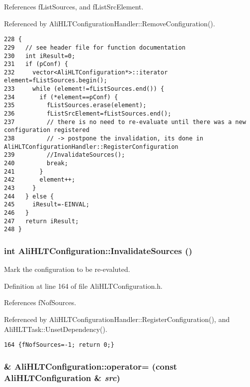 References f\-List\-Sources, and f\-List\-Src\-Element.

Referenced by Ali\-HLTConfiguration\-Handler::Remove\-Configuration().

\footnotesize\begin{verbatim}228 {
229   // see header file for function documentation
230   int iResult=0;
231   if (pConf) {
232     vector<AliHLTConfiguration*>::iterator element=fListSources.begin();
233     while (element!=fListSources.end()) {
234       if (*element==pConf) {
235         fListSources.erase(element);
236         fListSrcElement=fListSources.end();
237         // there is no need to re-evaluate until there was a new configuration registered
238         // -> postpone the invalidation, its done in AliHLTConfigurationHandler::RegisterConfiguration
239         //InvalidateSources();
240         break;
241       }
242       element++;
243     }
244   } else {
245     iResult=-EINVAL;
246   }
247   return iResult;
248 }
\end{verbatim}\normalsize 


\subsubsection{\setlength{\rightskip}{0pt plus 5cm}int Ali\-HLTConfiguration::Invalidate\-Sources ()\hspace{0.3cm}{\tt  [inline]}}\label{classAliHLTConfiguration_a15}


Mark the configuration to be re-evaluted. 

Definition at line 164 of file Ali\-HLTConfiguration.h.

References f\-Nof\-Sources.

Referenced by Ali\-HLTConfiguration\-Handler::Register\-Configuration(), and Ali\-HLTTask::Unset\-Dependency().

\footnotesize\begin{verbatim}164 {fNofSources=-1; return 0;}
\end{verbatim}\normalsize 


\subsubsection{ \& Ali\-HLTConfiguration::operator= (const {\bf Ali\-HLTConfiguration} \& {\em src})}\label{classAliHLTConfiguration_a3}



